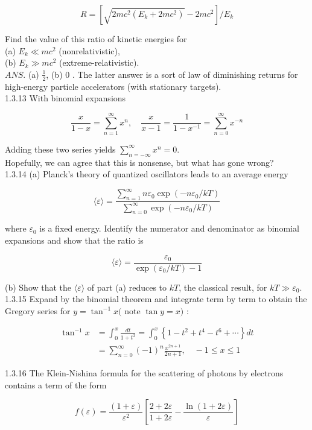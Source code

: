 \documentclass[10pt]{article}
\begin{document}
$$
R=\left[\sqrt{2 m c^{2}\left(E_{k}+2 m c^{2}\right)}-2 m c^{2}\right] / E_{k}
$$

Find the value of this ratio of kinetic energies for\\
(a) $E_{k} \ll m c^{2}$ (nonrelativistic),\\
(b) $E_{k} \gg m c^{2}$ (extreme-relativistic).\\
$A N S$. (a) $\frac{1}{2}$, (b) 0 . The latter answer is a sort of law of diminishing returns for high-energy particle accelerators (with stationary targets).\\
1.3.13 With binomial expansions

$$
\frac{x}{1-x}=\sum_{n=1}^{\infty} x^{n}, \quad \frac{x}{x-1}=\frac{1}{1-x^{-1}}=\sum_{n=0}^{\infty} x^{-n}
$$

Adding these two series yields $\sum_{n=-\infty}^{\infty} x^{n}=0$.\\
Hopefully, we can agree that this is nonsense, but what has gone wrong?\\
1.3.14 (a) Planck's theory of quantized oscillators leads to an average energy

$$
\langle\varepsilon\rangle=\frac{\sum_{n=1}^{\infty} n \varepsilon_{0} \exp \left(-n \varepsilon_{0} / k T\right)}{\sum_{n=0}^{\infty} \exp \left(-n \varepsilon_{0} / k T\right)}
$$

where $\varepsilon_{0}$ is a fixed energy. Identify the numerator and denominator as binomial expansions and show that the ratio is

$$
\langle\varepsilon\rangle=\frac{\varepsilon_{0}}{\exp \left(\varepsilon_{0} / k T\right)-1}
$$

(b) Show that the $\langle\varepsilon\rangle$ of part (a) reduces to $k T$, the classical result, for $k T \gg \varepsilon_{0}$.\\
1.3.15 Expand by the binomial theorem and integrate term by term to obtain the Gregory series for $y=\tan ^{-1} x($ note $\tan y=x)$ :

$$
\begin{aligned}
\tan ^{-1} x & =\int_{0}^{x} \frac{d t}{1+t^{2}}=\int_{0}^{x}\left\{1-t^{2}+t^{4}-t^{6}+\cdots\right\} d t \\
& =\sum_{n=0}^{\infty}(-1)^{n} \frac{x^{2 n+1}}{2 n+1}, \quad-1 \leq x \leq 1
\end{aligned}
$$

1.3.16 The Klein-Nishina formula for the scattering of photons by electrons contains a term of the form

$$
f(\varepsilon)=\frac{(1+\varepsilon)}{\varepsilon^{2}}\left[\frac{2+2 \varepsilon}{1+2 \varepsilon}-\frac{\ln (1+2 \varepsilon)}{\varepsilon}\right]
$$
\end{document}
